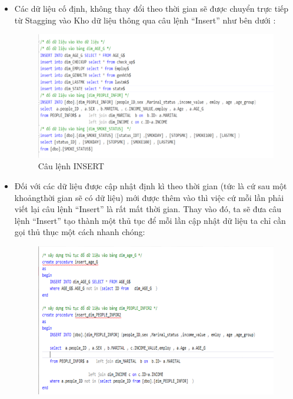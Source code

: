 \begin{itemize}
    \item Các dữ liệu cố định, không thay đổi theo thời gian sẽ được chuyển trực tiếp từ Stagging vào Kho dữ liệu thông qua câu lệnh “Insert” như bên dưới :
    \begin{center}
            \begin{figure}[!h]
                \centering
                \includegraphics[scale = 0.6]{HONG/8.png} 
              \caption{Câu lệnh INSERT}
            \end{figure}
\end{center}
\item Đối với các dữ liệu được cập nhật định kì theo thời gian (tức là cứ sau một khoảngthời gian sẽ có dữ liệu) mới được thêm vào thì việc cứ mỗi lần  phải viết lại câu lệnh “Insert” là rất mất thời gian. Thay vào đó, ta sẽ đưa câu lệnh “Insert” tạo thành một thủ tục để mỗi lần cập nhật dữ liệu ta chỉ cần gọi thủ thục một cách nhanh chóng:
\begin{center}
            \begin{figure}[!h]
                \centering
                \includegraphics[scale = 0.75]{HONG/9.png} 

\end{figure}
\end{center}
\end{itemize}
